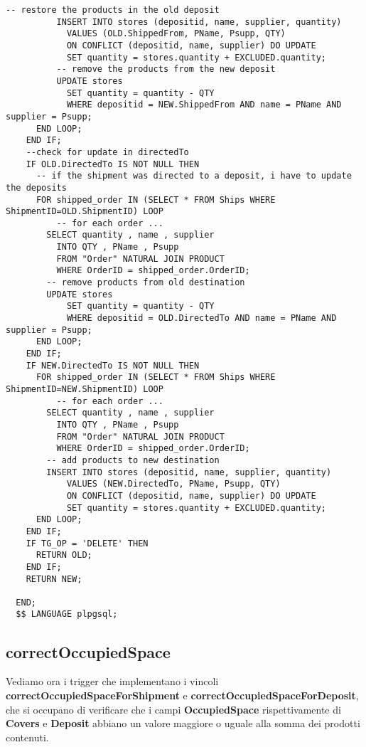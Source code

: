 \begin{lstlisting}[caption={Funzione completa}]
          -- restore the products in the old deposit
          INSERT INTO stores (depositid, name, supplier, quantity)
            VALUES (OLD.ShippedFrom, PName, Psupp, QTY)
            ON CONFLICT (depositid, name, supplier) DO UPDATE
            SET quantity = stores.quantity + EXCLUDED.quantity;
          -- remove the products from the new deposit
          UPDATE stores
            SET quantity = quantity - QTY
            WHERE depositid = NEW.ShippedFrom AND name = PName AND supplier = Psupp;
      END LOOP;
    END IF;
    --check for update in directedTo
    IF OLD.DirectedTo IS NOT NULL THEN
      -- if the shipment was directed to a deposit, i have to update the deposits
      FOR shipped_order IN (SELECT * FROM Ships WHERE ShipmentID=OLD.ShipmentID) LOOP
          -- for each order ...
        SELECT quantity , name , supplier 
          INTO QTY , PName , Psupp
          FROM "Order" NATURAL JOIN PRODUCT
          WHERE OrderID = shipped_order.OrderID;
        -- remove products from old destination
        UPDATE stores
            SET quantity = quantity - QTY
            WHERE depositid = OLD.DirectedTo AND name = PName AND supplier = Psupp;
      END LOOP;
    END IF;
    IF NEW.DirectedTo IS NOT NULL THEN
      FOR shipped_order IN (SELECT * FROM Ships WHERE ShipmentID=NEW.ShipmentID) LOOP
          -- for each order ...
        SELECT quantity , name , supplier 
          INTO QTY , PName , Psupp
          FROM "Order" NATURAL JOIN PRODUCT
          WHERE OrderID = shipped_order.OrderID;
        -- add products to new destination
        INSERT INTO stores (depositid, name, supplier, quantity)
            VALUES (NEW.DirectedTo, PName, Psupp, QTY)
            ON CONFLICT (depositid, name, supplier) DO UPDATE
            SET quantity = stores.quantity + EXCLUDED.quantity;
      END LOOP;
    END IF;
    IF TG_OP = 'DELETE' THEN
      RETURN OLD;
    END IF;
    RETURN NEW;
    
  END;
  $$ LANGUAGE plpgsql;
\end{lstlisting}

\subsection{\textbf{correctOccupiedSpace}}

Vediamo ora i trigger che implementano i vincoli \textbf{correctOccupiedSpaceForShipment} e \textbf{correctOccupiedSpaceForDeposit}, che si occupano di verificare che i campi \textbf{OccupiedSpace} rispettivamente di \textbf{Covers} e \textbf{Deposit} abbiano un valore maggiore o uguale alla somma dei prodotti contenuti.

